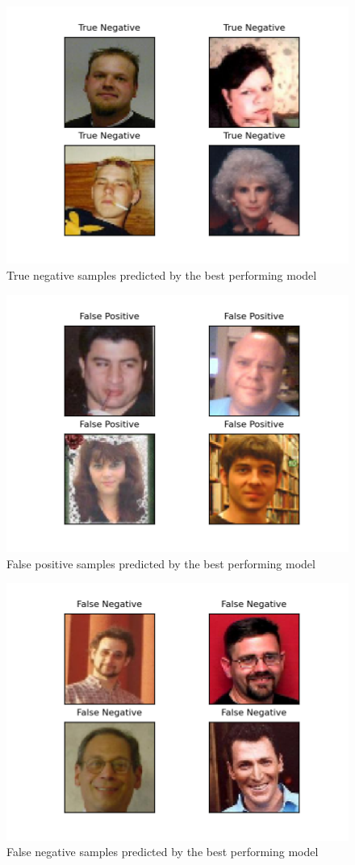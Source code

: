 \documentclass[12pt,a4paper,english
]{tunithesis}
\begin{document}
\begin{figure}[hbt!]
  \centering
  \includegraphics[width=0.8\columnwidth]{img/tns.png}
  \caption{True negative samples predicted by the best performing model}
  \label{fig:tns}
\end{figure}

\begin{figure}[hbt!]
  \centering
  \includegraphics[width=0.8\columnwidth]{img/fps.png}
  \caption{False positive samples predicted by the best performing model}
  \label{fig:fps}
\end{figure}

\begin{figure}[hbt!]
  \centering
  \includegraphics[width=0.8\columnwidth]{img/fns.png}
  \caption{False negative samples predicted by the best performing model}
  \label{fig:fns}
\end{figure}
\end{document}
